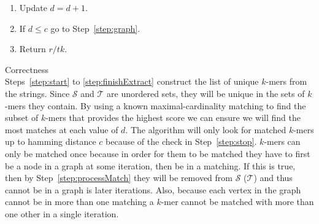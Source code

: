 \documentclass[11pt, oneside]{article}   	%
\newcommand{\kmer}{$k$-mer\xspace}
\newcommand{\kmers}{\kmer{}s\xspace}
\begin{document}
\begin{enumerate}
\begin{itemize}
\end{itemize}
\item \label{step:endDLoop} Update $d = d+1$.
\item \label{step:stop} If $d\le c$ go to Step~\ref{step:graph}.
\item Return $r/tk$.
\end{enumerate}


{\Large Correctness}\\ 
Steps~\ref{step:start} to \ref{step:finishExtract} construct the list of unique \kmers from the strings. 
Since $\mathcal{S}$ and $\mathcal{T}$ are unordered sets, they will be unique in the sets of \kmers they contain. 
By using a known maximal-cardinality matching to find the subset of \kmers that provides the highest score we can ensure we will find the most matches at each value of $d$. 
The algorithm will only look for matched \kmers up to hamming distance $c$ because of the check in Step~\ref{step:stop}.
\kmers can only be matched once because in order for them to be matched they have to first be a node in a graph at some iteration, then be in a matching. 
If this is true, then by Step~\ref{step:processMatch} they will be removed from $\mathcal{S}$ ($\mathcal{T}$) and thus cannot be in a graph is later iterations. 
Also, because each vertex in the graph cannot be in more than one matching a \kmer cannot be matched with more than one other in a single iteration.  
\end{document}
